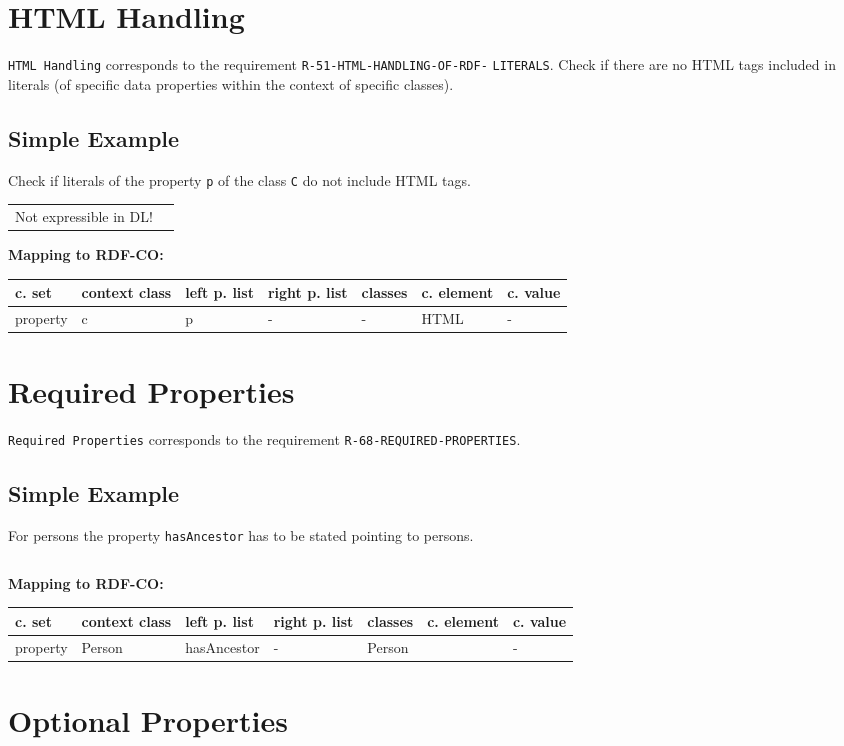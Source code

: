 \documentclass{llncs}
\newcommand{\ms}[1]{\texttt{#1}}
\newenvironment{gcotable}{
  \scriptsize
  \sffamily
  \vspace{0cm}
	\begin{center}
	\textbf{\vspace{0.4cm}Mapping to RDF-CO:} \\
  \begin{tabular}{l|l|l|l|l|l|l}
	\hline
  \textbf{c. set} & \textbf{context class} & \textbf{left p. list} & \textbf{right p. list} & \textbf{classes} & \textbf{c. element} & \textbf{c. value} \\
  \hline

}{
  \hline
  \end{tabular}
	\end{center}
}
\newenvironment{DL}{
\vspace{0cm}
	\begin{center}
  \begin{tabular}{r l}

}{
  \end{tabular}
	\end{center}
}
\begin{document}
\section{HTML Handling}

\ms{HTML Handling} corresponds to the requirement
\ms{R-51-HTML-HANDLING-OF-RDF-} \ms{LITERALS}.
Check if there are no HTML tags included in literals (of specific data properties within the context of specific classes).

\subsection{Simple Example}

Check if literals of the property \ms{p} of the class \ms{C} do not include HTML tags.

\begin{DL}
Not expressible in DL!
\end{DL}

\begin{gcotable}
property & c & p & - & - & HTML & - \\
\end{gcotable}

\section{Required Properties}

\ms{Required Properties} corresponds to the requirement \ms{R-68-REQUIRED-PROPERTIES}.

\subsection{Simple Example}

For persons the property \ms{hasAncestor} has to be stated pointing to persons.

\begin{DL}

\end{DL}

\begin{gcotable}
property & Person & hasAncestor & - & Person &  & - \\
\end{gcotable}

\section{Optional Properties}
\end{document}
